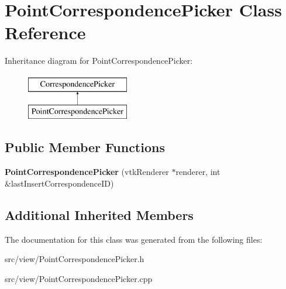 \hypertarget{class_point_correspondence_picker}{}\section{Point\+Correspondence\+Picker Class Reference}
\label{class_point_correspondence_picker}
Inheritance diagram for Point\+Correspondence\+Picker\+:\begin{figure}[H]
\begin{center}
\leavevmode
\includegraphics[height=2.000000cm]{class_point_correspondence_picker}
\end{center}
\end{figure}
\subsection*{Public Member Functions}
\begin{DoxyCompactItemize}
\item 
\hypertarget{class_point_correspondence_picker_a07a5158a5629e78afadc955674109a61}{}{\bfseries Point\+Correspondence\+Picker} (vtk\+Renderer $\ast$renderer, int \&last\+Insert\+Correspondence\+I\+D)\label{class_point_correspondence_picker_a07a5158a5629e78afadc955674109a61}

\end{DoxyCompactItemize}
\subsection*{Additional Inherited Members}


The documentation for this class was generated from the following files\+:\begin{DoxyCompactItemize}
\item 
src/view/Point\+Correspondence\+Picker.\+h\item 
src/view/Point\+Correspondence\+Picker.\+cpp\end{DoxyCompactItemize}
